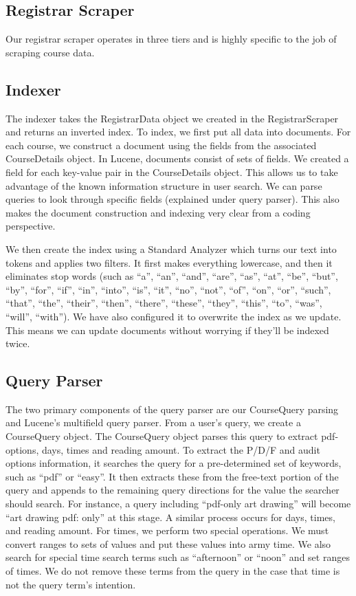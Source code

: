 \documentclass[12pt,letterpaper]{article}
\begin{document}
\subsection{Registrar Scraper}
Our registrar scraper operates in three tiers and is highly specific to the job of scraping course data. 

\subsection{Indexer}
	
The indexer takes the RegistrarData object we created in the RegistrarScraper and returns an inverted index. To index, we first put all data into documents. For each course, we construct a document using the fields from the associated CourseDetails object. In Lucene, documents consist of sets of fields. We created a field for each key-value pair in the CourseDetails object. This allows us to take advantage of the known information structure in user search. We can parse queries to look through specific fields (explained under query parser). This also makes the document construction and indexing very clear from a coding perspective. 

We then create the index using a Standard Analyzer which turns our text into tokens and applies two filters. It first makes everything lowercase, and then it eliminates stop words (such as ``a'', ``an'',  ``and'', ``are'', ``as'', ``at'', ``be'', ``but'', ``by'', ``for'', ``if'', ``in'', ``into'', ``is'', ``it'', ``no'', ``not'', ``of'', ``on'', ``or'', ``such'', ``that'', ``the'', ``their'', ``then'', ``there'', ``these'', ``they'', ``this'', ``to'', ``was'', ``will'', ``with''). We have also configured it to overwrite the index as we update. This means we can update documents without worrying if they'll be indexed twice. 
	
\subsection{Query Parser}
	
The two primary components of the query parser are our CourseQuery parsing and Lucene's multifield query parser. From a user's query, we create a CourseQuery object. The CourseQuery object parses this query to extract pdf-options, days, times and reading amount. To extract the P/D/F and audit options information, it searches the query for a pre-determined set of keywords, such as ``pdf'' or ``easy''. It then extracts these from the free-text portion of the query and appends to the remaining query directions for the value the searcher should search. For instance, a query including ``pdf-only art drawing'' will become ``art drawing pdf: only'' at this stage. A similar process occurs for days, times, and reading amount. For times, we perform two special operations. We must convert ranges to sets of values and put these values into army time. We also search for special time search terms such as ``afternoon'' or ``noon'' and set ranges of times. We do not remove these terms from the query in the case that time is not the query term's intention. 
\end{document}
